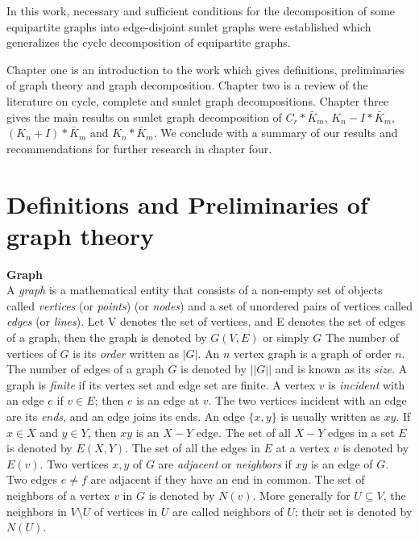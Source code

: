 \documentclass[12pt]{report}
\begin{document}
In this work, necessary and sufficient conditions for the
decomposition of some equipartite graphs into edge-disjoint sunlet
graphs were established which generalizes the cycle decomposition of
equipartite graphs.

Chapter one is an introduction to the work which
gives definitions, preliminaries of graph theory and graph
decomposition. Chapter two is a review of the literature on cycle,
complete and sunlet graph decompositions. Chapter three gives the
main results on sunlet graph decomposition of $C_r*\bar{K}_m$,
$K_n-I*\bar{K}_m$, $(K_n+I)*\bar{K}_m$ and $K_n*\bar{K}_m$. We
conclude with a summary of our results and recommendations for
further research in chapter four.
\section{Definitions and Preliminaries of graph theory}
  {\bf Graph}\\
A {\em graph} is a mathematical entity that consists of a non-empty
set of objects called {\em vertices} (or {\em points}) (or {\em
nodes})  and a set of unordered pairs of vertices called {\em edges}
(or {\em lines}). Let V denotes the set of vertices, and E denotes
the set of edges of a graph, then the graph is denoted by $G(V, E)$
or simply $G$ The number of vertices of $G$ is its {\em order}
written as $|G|$. An $n$ vertex graph is a graph of order $n$. The
number of edges of a graph $G$ is denoted by $||G||$ and is known as
its {\em size}. A graph is {\em finite} if its vertex set and edge
set are finite.  A vertex $v$ is {\em incident} with an edge $e$ if
$v \in E$; then $e$ is an edge at $v$. The two vertices incident
with an edge are its {\em ends}, and an edge joins its ends. An edge
$\{ x,y\}$ is usually written as $xy$. If $x \in X$ and $y \in Y$,
then $xy$ is an $X-Y$ edge. The set of all $X-Y$ edges in a set $E$
is denoted by $E(X,Y)$. The set of all the edges in $E$ at a vertex
$v$ is denoted by $E(v)$.
Two vertices $x,y$ of $G$  are {\em adjacent} or {\em neighbors} if $xy$ is an edge of $G$. Two edges $e\neq f$ are adjacent if they have an end in common. The set of neighbors of a vertex $v$ in $G$ is denoted by $N(v)$. More generally for $U\subseteq V$, the neighbors in $V\setminus U$ of vertices in $U$ are called neighbors of $U$; their set is denoted by $N(U)$.\\
\end{document}
